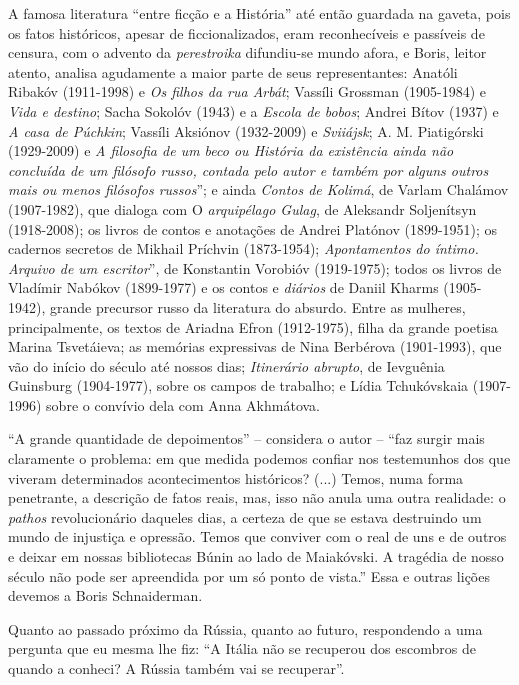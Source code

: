 A famosa literatura ``entre ficção e a História'' até então guardada na
gaveta, pois os fatos históricos, apesar de ficcionalizados, eram
reconhecíveis e passíveis de censura, com o advento da
\emph{perestroika} difundiu-se mundo afora, e Boris, leitor atento,
analisa agudamente a maior parte de seus representantes: Anatóli Ribakóv
(1911-1998) e \emph{Os filhos da rua Arbát}; Vassíli Grossman
(1905-1984) e \emph{Vida e destino}; Sacha Sokolóv (1943) e a
\emph{Escola de bobos}; Andrei Bítov (1937) e \emph{A casa de Púchkin};
Vassíli Aksiónov (1932-2009) e \emph{Sviiájsk}; A. M. Piatigórski
(1929-2009) e \emph{A filosofia de um beco ou História da existência
ainda não concluída de um filósofo russo, contada pelo autor e também
por alguns outros mais ou menos filósofos russos}''; e ainda
\emph{Contos de Kolimá}, de Varlam Chalámov (1907-1982), que dialoga com
O \emph{arquipélago Gulag}, de Aleksandr Soljenítsyn (1918-2008); os
livros de contos e anotações de Andrei Platónov (1899-1951); os cadernos
secretos de Mikhail Príchvin (1873-1954); \emph{Apontamentos do íntimo.
Arquivo de um escritor}'', de Konstantin Vorobióv (1919-1975); todos os
livros de Vladímir Nabókov (1899-1977) e os contos e \emph{diários} de
Daniil Kharms (1905-1942), grande precursor russo da literatura do
absurdo. Entre as mulheres, principalmente, os textos de Ariadna Efron
(1912-1975), filha da grande poetisa Marina Tsvetáieva; as memórias
expressivas de Nina Berbérova (1901-1993), que vão do início do século
até nossos dias; \emph{Itinerário abrupto}, de Ievguênia Guinsburg
(1904-1977), sobre os campos de trabalho; e Lídia Tchukóvskaia
(1907-1996) sobre o convívio dela com Anna Akhmátova.

``A grande quantidade de depoimentos'' -- considera o autor -- ``faz
surgir mais claramente o problema: em que medida podemos confiar nos
testemunhos dos que viveram determinados acontecimentos históricos?
(...) Temos, numa forma penetrante, a descrição de fatos reais, mas,
isso não anula uma outra realidade: o \emph{pathos} revolucionário
daqueles dias, a certeza de que se estava destruindo um mundo de
injustiça e opressão. Temos que conviver com o real de uns e de outros e
deixar em nossas bibliotecas Búnin ao lado de Maiakóvski. A tragédia de
nosso século não pode ser apreendida por um só ponto de vista.'' Essa e
outras lições devemos a Boris Schnaiderman.

Quanto ao passado próximo da Rússia, quanto ao futuro, respondendo a uma
pergunta que eu mesma lhe fiz: ``A Itália não se recuperou dos escombros
de quando a conheci? A Rússia também vai se recuperar''.



